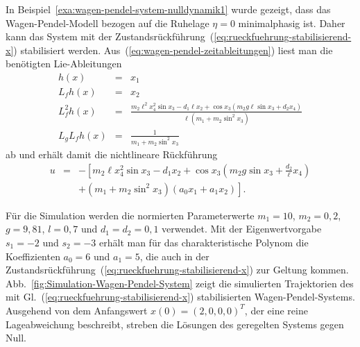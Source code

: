 \begin{example}
\label{exa:Wagen-Pendel-Stabilisierung-Simulation}In Beispiel~\ref{exa:wagen-pendel-system-nulldynamik1}
wurde gezeigt, dass das Wagen-Pendel-Modell bezogen auf die Ruhelage
$\eta=0$ minimalphasig ist. Daher kann das System mit der Zustandsrückführung~(\ref{eq:rueckfuehrung-stabilisierend-x})
stabilisiert werden. Aus~(\ref{eq:wagen-pendel-zeitableitungen})
liest man die benötigten Lie-Ableitungen 
\[
\begin{array}{lcl}
h(x) & = & x_{1}\\
L_{f}h(x) & = & x_{2}\\
L_{f}^{2}h(x) & = & \frac{m_{2}\ell^{2}x_{4}^{2}\sin x_{3}-d_{1}\ell x_{2}+\cos x_{3}\left(m_{2}g\ell\sin x_{3}+d_{2}x_{4}\right)}{\ell\left(m_{1}+m_{2}\sin^{2}x_{3}\right)}\\
L_{g}L_{f}h(x) & = & \frac{1}{m_{1}+m_{2}\sin^{2}x_{3}}
\end{array}
\]
ab und erhält damit die nichtlineare Rückführung
\[
\begin{array}{ccl}
u & = & -\left[m_{2}\ell x_{4}^{2}\sin x_{3}-d_{1}x_{2}+\cos x_{3}\left(m_{2}g\sin x_{3}+\frac{d_{2}}{\ell}x_{4}\right)\right.\\
 &  & +\left.\left(m_{1}+m_{2}\sin^{2}x_{3}\right)\left(a_{0}x_{1}+a_{1}x_{2}\right)\right].
\end{array}
\]

Für die Simulation werden die normierten Parameterwerte $m_{1}=10$,
$m_{2}=0,2$, $g=9,81$, $l=0,7$ und $d_{1}=d_{2}=0,1$ verwendet.
Mit der Eigenwertvorgabe $s_{1}=-2$ und $s_{2}=-3$ erhält man für
das charakteristische Polynom die Koeffizienten $a_{0}=6$ und $a_{1}=5$,
die auch in der Zustandsrückführung~(\ref{eq:rueckfuehrung-stabilisierend-x})
zur Geltung kommen. Abb.~\ref{fig:Simulation-Wagen-Pendel-System}
zeigt die simulierten Trajektorien des mit Gl.~(\ref{eq:rueckfuehrung-stabilisierend-x})
stabilisierten Wagen-Pendel-Systems. Ausgehend von dem Anfangswert
$x(0)=(2,0,0,0)^{T}$, der eine reine Lageabweichung beschreibt, streben
die Lösungen des geregelten Systems gegen Null.
\end{example}
